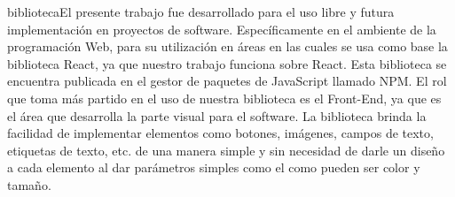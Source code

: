 bibliotecaEl presente trabajo fue desarrollado para el uso libre y futura implementación en proyectos de software. Específicamente en el ambiente de la programación Web, para su utilización en áreas en las cuales se usa como base la biblioteca React, ya que nuestro trabajo funciona sobre React.
 \newline
  \newline
Esta biblioteca se encuentra publicada en el gestor de paquetes de JavaScript llamado NPM. 
 \newline
  \newline
El rol que toma más partido en el uso de nuestra biblioteca es el Front-End, ya que es el área que desarrolla la parte visual para el software. La biblioteca brinda la facilidad de implementar elementos como botones, imágenes, campos de texto, etiquetas de texto, etc. de una manera simple y sin necesidad de darle un diseño a cada elemento al dar parámetros simples como el como pueden ser color y tamaño.
